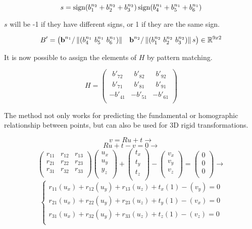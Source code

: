 \[
s = \operatorname{sign}(b^{n_2}_1 + b^{n_2}_2 + b^{n_2}_3) \operatorname{sign}(b^{n_1}_4 + b^{n_1}_5 + b^{n_1}_6)
\]

$s$ will be -1 if they have different signs, or 1 if they are the same sign.

\[
B'=
\begin{pmatrix}
\textbf{b}^{n_1} / \left\lVert(b^{n_1}_4 \ b^{n_1}_5 \ b^{n_1}_6)
\right\rVert &
\textbf{b}^{n_2} / \left\lVert(b^{n_2}_1 \ b^{n_2}_2 \ b^{n_2}_3)\right\rVert s
\end{pmatrix}
\in \mathbb{R}^{9x2}
\]

It is now possible to assign the elements of $H$ by pattern matching.

\[
H=
\begin{pmatrix}
\ \ b'_{72} & \ \ b'_{82} & \ \ b'_{92} \\
\ \ b'_{71} & \ \ b'_{81} & \ \ b'_{91} \\
-b'_{41} & -b'_{51} & -b'_{61} \\
\end{pmatrix}
\]

The method not only works for predicting the fundamental or homographic relationship between points, but can also be used for 3D rigid transformations.

\[
v=Ru+t \rightarrow
\]
\[
Ru+t-v=0 \rightarrow
\]
\[
\begin{pmatrix}
r_{11} & r_{12} & r_{13} \\
r_{21} & r_{22} & r_{23} \\
r_{31} & r_{32} & r_{33} \\
\end{pmatrix}
\begin{pmatrix}
u_x \\
u_y \\
y_z \\
\end{pmatrix}
+
\begin{pmatrix}
t_x \\
t_y \\
t_z \\
\end{pmatrix}
-
\begin{pmatrix}
v_x \\
v_y \\
v_z \\
\end{pmatrix}
=
\begin{pmatrix}
0 \\
0 \\
0 \\
\end{pmatrix}
\rightarrow
\]
\[
\begin{cases}
r_{11} (u_x) + r_{12} (u_y) + r_{13} (u_z) + t_x (1) - (v_y) = 0 \\
r_{21} (u_x) + r_{22} (u_y) + r_{23} (u_z) + t_y (1) - (v_x) = 0 \\
r_{31} (u_x) + r_{32} (u_y) + r_{33} (u_z) + t_z (1) - (v_z) = 0 \\
\end{cases}
\]

